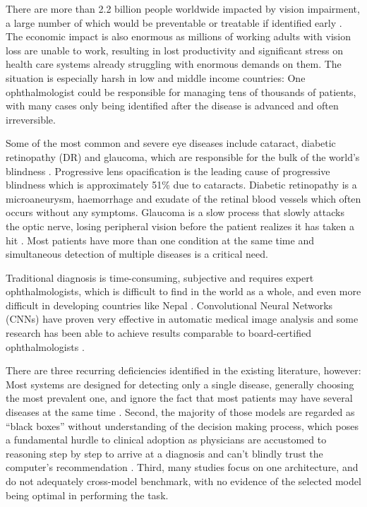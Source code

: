 \documentclass[conference]{IEEEtran}
\begin{document}
There are more than 2.2 billion people worldwide impacted by vision impairment, a large number of which would be preventable or treatable if identified early \cite{paper1, paper2}. The economic impact is also enormous as millions of working adults with vision loss are unable to work, resulting in lost productivity and significant stress on health care systems already struggling with enormous demands on them. The situation is especially harsh in low and middle income countries: One ophthalmologist could be responsible for managing tens of thousands of patients, with many cases only being identified after the disease is advanced and often irreversible.

Some of the most common and severe eye diseases include cataract, diabetic retinopathy (DR) and glaucoma, which are responsible for the bulk of the world's blindness \cite{paper3, paper4}. Progressive lens opacification is the leading cause of progressive blindness which is approximately 51\% due to cataracts. Diabetic retinopathy is a microaneurysm, haemorrhage and exudate of the retinal blood vessels which often occurs without any symptoms. Glaucoma is a slow process that slowly attacks the optic nerve, losing peripheral vision before the patient realizes it has taken a hit \cite{paper4, paper6}. Most patients have more than one condition at the same time and simultaneous detection of multiple diseases is a critical need.

Traditional diagnosis is time-consuming, subjective and requires expert ophthalmologists, which is difficult to find in the world as a whole, and even more difficult in developing countries like Nepal \cite{paper5}. Convolutional Neural Networks (CNNs) have proven very effective in automatic medical image analysis and some research has been able to achieve results comparable to board-certified ophthalmologists \cite{paper7, paper8, paper9, paper10}.

There are three recurring deficiencies identified in the existing literature, however: Most systems are designed for detecting only a single disease, generally choosing the most prevalent one, and ignore the fact that most patients may have several diseases at the same time \cite{paper9, paper10}. Second, the majority of those models are regarded as ``black boxes'' without understanding of the decision making process, which poses a fundamental hurdle to clinical adoption as physicians are accustomed to reasoning step by step to arrive at a diagnosis and can't blindly trust the computer's recommendation \cite{paper13, paper14}. Third, many studies focus on one architecture, and do not adequately cross-model benchmark, with no evidence of the selected model being optimal in performing the task.
\end{document}
